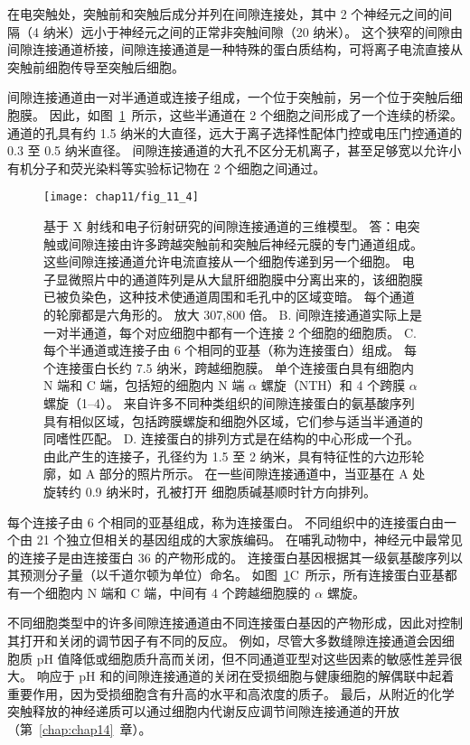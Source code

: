 在电突触处，突触前和突触后成分并列在间隙连接处，其中 2 个神经元之间的间隔（4 纳米）远小于神经元之间的正常非突触间隙（20 纳米）。
这个狭窄的间隙由间隙连接通道桥接，间隙连接通道是一种特殊的蛋白质结构，可将离子电流直接从突触前细胞传导至突触后细胞。


间隙连接通道由一对半通道或连接子组成，一个位于突触前，另一个位于突触后细胞膜。
因此，如图~\ref{fig:11_4}~所示，这些半通道在 2 个细胞之间形成了一个连续的桥梁。
通道的孔具有约 1.5 纳米的大直径，远大于离子选择性配体门控或电压门控通道的 0.3 至 0.5 纳米直径。
间隙连接通道的大孔不区分无机离子，甚至足够宽以允许小有机分子和荧光染料等实验标记物在 2 个细胞之间通过。


\begin{figure}[htbp]
	\centering
	\texttt{[image: chap11/fig\_11\_4]}
	\caption{基于 X 射线和电子衍射研究的间隙连接通道的三维模型。
		答：电突触或间隙连接由许多跨越突触前和突触后神经元膜的专门通道组成。
		这些间隙连接通道允许电流直接从一个细胞传递到另一个细胞。
		电子显微照片中的通道阵列是从大鼠肝细胞膜中分离出来的，该细胞膜已被负染色，这种技术使通道周围和毛孔中的区域变暗。
		每个通道的轮廓都是六角形的。
		放大 307,800 倍。
		B. 间隙连接通道实际上是一对半通道，每个对应细胞中都有一个连接 2 个细胞的细胞质\cite{makowski1977gap}。
		C. 每个半通道或连接子由 6 个相同的亚基（称为连接蛋白）组成。
		每个连接蛋白长约 7.5 纳米，跨越细胞膜。
		单个连接蛋白具有细胞内 N 端和 C 端，包括短的细胞内 N 端 $\alpha$ 螺旋（NTH）和 4 个跨膜 $\alpha$ 螺旋（1–4）。
		来自许多不同种类组织的间隙连接蛋白的氨基酸序列具有相似区域，包括跨膜螺旋和细胞外区域，它们参与适当半通道的同嗜性匹配。
		D. 连接蛋白的排列方式是在结构的中心形成一个孔。
		由此产生的连接子，孔径约为 1.5 至 2 纳米，具有特征性的六边形轮廓，如 A 部分的照片所示。
		在一些间隙连接通道中，当亚基在 A 处旋转约 0.9 纳米时，孔被打开 细胞质碱基顺时针方向排列\cite{unwin1980structure}。}
	\label{fig:11_4}
\end{figure}


每个连接子由 6 个相同的亚基组成，称为连接蛋白。
不同组织中的连接蛋白由一个由 21 个独立但相关的基因组成的大家族编码。
在哺乳动物中，神经元中最常见的连接子是由连接蛋白 36 的产物形成的。
连接蛋白基因根据其一级氨基酸序列以其预测分子量（以千道尔顿为单位）命名。
如图~\ref{fig:11_4}C~所示，所有连接蛋白亚基都有一个细胞内 N 端和 C 端，中间有 4 个跨越细胞膜的 $\alpha$ 螺旋。


不同细胞类型中的许多间隙连接通道由不同连接蛋白基因的产物形成，因此对控制其打开和关闭的调节因子有不同的反应。
例如，尽管大多数缝隙连接通道会因细胞质 pH 值降低或细胞质升高而关闭，但不同通道亚型对这些因素的敏感性差异很大。
响应于 pH 和的间隙连接通道的关闭在受损细胞与健康细胞的解偶联中起着重要作用，因为受损细胞含有升高的水平和高浓度的质子。
最后，从附近的化学突触释放的神经递质可以通过细胞内代谢反应调节间隙连接通道的开放（第~\ref{chap:chap14}~章）。


